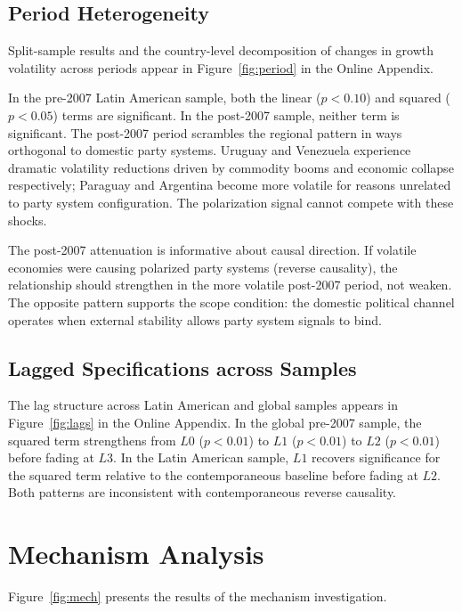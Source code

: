 \documentclass[12pt]{article}
\begin{document}
\subsection{Period Heterogeneity}

Split-sample results and the country-level decomposition of changes in
growth volatility across periods appear in Figure~\ref{fig:period} in the
Online Appendix.

In the pre-2007 Latin American sample, both the linear ($p < 0.10$) and
squared ($p < 0.05$) terms are significant. In the post-2007 sample, neither
term is significant. The post-2007 period scrambles the regional pattern in
ways orthogonal to domestic party systems. Uruguay and
Venezuela experience dramatic volatility reductions driven by commodity booms
and economic collapse respectively; Paraguay and Argentina become more
volatile for reasons unrelated to party system configuration. The polarization
signal cannot compete with these shocks.

The post-2007 attenuation is informative about causal direction. If volatile
economies were causing polarized party systems (reverse causality), the
relationship should strengthen in the more volatile post-2007 period, not
weaken. The opposite pattern supports the scope condition: the domestic
political channel operates when external stability allows party system
signals to bind.

\subsection{Lagged Specifications across Samples}

The lag structure across Latin American and global samples appears in
Figure~\ref{fig:lags} in the Online Appendix.
In the global pre-2007 sample, the squared term strengthens from $L0$
($p < 0.01$) to $L1$ ($p < 0.01$) to $L2$ ($p < 0.01$) before fading at
$L3$. In the Latin American sample, $L1$ recovers significance for the
squared term relative to the contemporaneous baseline before fading at $L2$.
Both patterns are inconsistent with contemporaneous reverse causality.

\section{Mechanism Analysis}

Figure~\ref{fig:mech} presents the results of the mechanism investigation.
\end{document}

